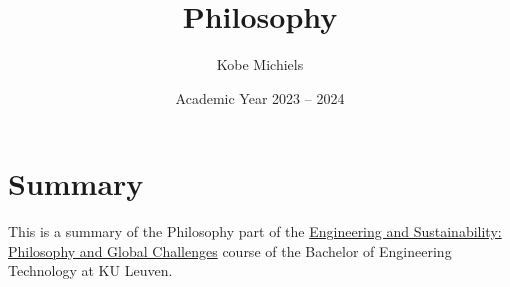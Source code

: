 \documentclass[kul]{kulakarticle} %
\title{Philosophy}
\author{Kobe Michiels}
\date{Academic Year 2023 -- 2024}
\begin{document}
	
	\maketitle
	
	\section*{Summary}
	
	This is a summary of the Philosophy part of the \href{https://onderwijsaanbod.kuleuven.be/syllabi/v/e/T3AID1E.htm#activetab=inhoud_idp1690064}{Engineering and Sustainability: Philosophy and Global Challenges} course of the Bachelor of Engineering Technology at KU Leuven.

	\setcounter{tocdepth}{2}
	\tableofcontents
	
	\newpage
	
	\newpage
	
	\newpage
	
	\newpage
	
	
\end{document}
